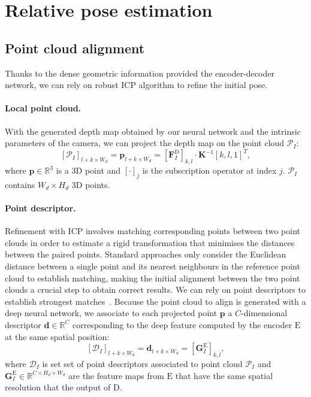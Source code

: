 \section{Relative pose estimation}
\label{sec:relative_pose}

\subsection{Point cloud alignment}

\label{subsec:pc_alignment}
Thanks to the dense geometric information provided the encoder-decoder network, we can rely on robust ICP algorithm to refine the initial pose. 

\paragraph{Local point cloud.}
With the generated depth map obtained by our neural network and the intrinsic parameters of the camera, we can project the depth map on the point cloud $\mathcal{P}_{I}$:
\begin{equation}
	\left[\mathcal{P}_{I}\right]_{l + k\times W_d} = \mathbf{p}_{l + k\times W_d} = \left[\mathbf{F}^{\mathrm{D}}_I\right]_{k,l} \cdot \mathbf{K}^{-1}[k, l, 1]^T,
\end{equation}
where $\mathbf{p}\in\mathbb{R}^{3}$ is a 3D point and $\left[\cdot\right]_j$ is the subscription operator at index $j$. $\mathcal{P}_{I}$ contains $W_d \times H_d$ 3D points.

\paragraph{Point descriptor.}
Refinement with ICP involves matching corresponding points between two point clouds in order to estimate a rigid transformation that minimises the distances between the paired points. Standard approaches only consider the Euclidean distance between a single point and its nearest neighbours in the reference point cloud to establish matching, making the initial alignment between the two point clouds a crucial step to obtain correct results. We can rely on point descriptors to establish strongest matches~\cite{Pomerleau2015}. Because the point cloud to align is generated with a deep neural network, we associate to each projected point $\mathbf{p}$ a $C$-dimensional descriptor $\mathbf{d}\in\mathbb{R}^{C}$ corresponding to the deep feature computed by the encoder $\mathrm{E}$ at the same spatial position:
\begin{equation}
	\left[ \mathcal{D}_{I} \right]_{l + k\times W_d} =  \mathbf{d}_{l + k\times W_d} = \left[ \mathbf{G}^{\mathrm{E}}_{I} \right]_{k, l},
\end{equation}
where $\mathcal{D}_{I}$ is set set of point descriptors associated to point cloud $\mathcal{P}_{I}$ and $\mathbf{G}^{\mathrm{E}}_{I} \in\mathbb{R}^{C\times H_d\times W_d}$ are the feature maps from $\mathrm{E}$ that have the same spatial resolution that the output of $\mathrm{D}$.

